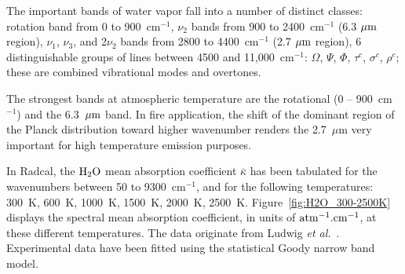 The important bands of water vapor fall into a number of distinct classes: rotation band from 0 to 900~cm$^{-1}$, $\nu_2$ bands from 900 to 2400~cm$^{-1}$ (6.3 $\rm \mu m$ region), $\nu_1$, $\nu_3$, and 2$\nu_2$ bands from 2800 to 4400~cm$^{-1}$ (2.7 $\rm \mu m$ region), 6 distinguishable groups of lines between 4500 and 11,000~cm$^{-1}$: $\Omega$, $\Psi$, $\Phi$, $\tau^c$, $\sigma^c$, $\rho^c$; these are combined vibrational modes and overtones.

The strongest bands at atmospheric temperature are the rotational (0 -- 900~cm$^{-1}$) and the 6.3~$\rm \mu m$ band. In fire application, the shift of the dominant region of the Planck distribution toward higher wavenumber renders the 2.7~$\mu$m very important for high temperature emission purposes.

In Radcal, the $\rm H_2O$ mean absorption coefficient $\bar{\kappa}$ has been tabulated for the wavenumbers between 50 to 9300~cm$^{-1}$, and for the following temperatures: 300~K, 600~K, 1000~K, 1500~K, 2000~K, 2500~K. Figure~\ref{fig:H2O_300-2500K} displays the spectral mean absorption coefficient, in units of $\rm atm^{-1}.cm^{-1}$, at these different temperatures. The data originate from Ludwig \textit{et al.}~\cite{Ludwig1973}. Experimental data have been fitted using the statistical Goody narrow band model.

